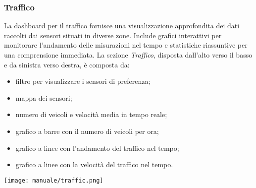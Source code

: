 \newpage
\subsubsection{Traffico}
La dashboard per il traffico fornisce una visualizzazione approfondita dei dati raccolti dai sensori situati in diverse zone. Include grafici interattivi per monitorare l'andamento delle misurazioni nel tempo e statistiche riassuntive per una comprensione immediata. La sezione \textit{Traffico}, disposta dall'alto verso il basso e da sinistra verso destra, è composta da:
\begin{itemize}
    \item filtro per visualizzare i sensori di preferenza;
    \item mappa dei sensori;
    \item numero di veicoli e velocità media in tempo reale;
    \item grafico a barre con il numero di veicoli per ora;
    \item grafico a linee con l'andamento del traffico nel tempo;
    \item grafico a linee con la velocità del traffico nel tempo.
\end{itemize}
\begin{center}
    \texttt{[image: manuale/traffic.png]}
\end{center}



